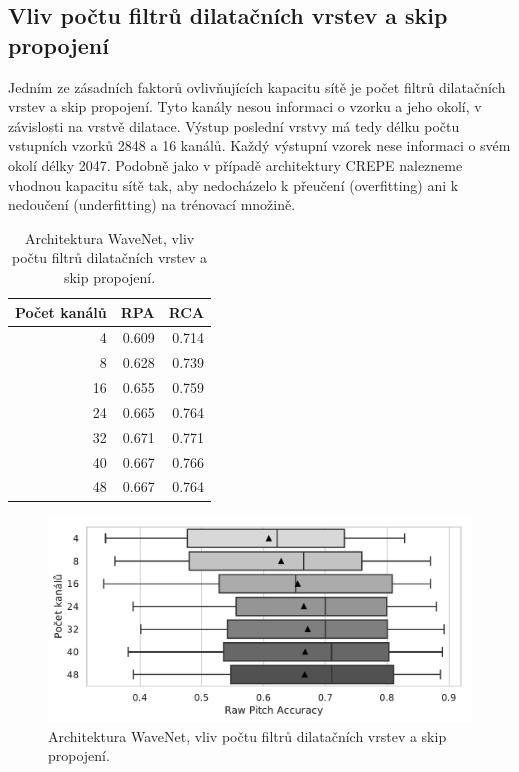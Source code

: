 \subsection{Vliv počtu filtrů dilatačních vrstev a skip propojení}

Jedním ze zásadních faktorů ovlivňujících kapacitu sítě je počet filtrů dilatačních vrstev a skip propojení. Tyto kanály nesou informaci o vzorku a jeho okolí, v závislosti na vrstvě dilatace. Výstup poslední vrstvy má tedy délku počtu vstupních vzorků 2848 a 16 kanálů. Každý výstupní vzorek nese informaci o svém okolí délky 2047. Podobně jako v případě architektury CREPE nalezneme vhodnou kapacitu sítě tak, aby nedocházelo k přeučení (overfitting) ani k nedoučení (underfitting) na trénovací množině.

\begin{table}[h!]
\centering
    \begin{tabular}{rrr}
    \toprule
    Počet kanálů &   RPA &   RCA \\
    \midrule
            4 & 0.609 & 0.714 \\
            8 & 0.628 & 0.739 \\
            16 & 0.655 & 0.759 \\
            24 & 0.665 & 0.764 \\
            32 & 0.671 & 0.771 \\
            40 & 0.667 & 0.766 \\
            48 & 0.667 & 0.764 \\
    \bottomrule
    \end{tabular}

\caption{Architektura WaveNet, vliv počtu filtrů dilatačních vrstev a skip propojení.}\label{tab:wavenet_dil_skip_channels}
\end{table}

\begin{figure}[h]\centering
    \includegraphics[scale=0.6]{../img/figures/wavenet_dil_skip_channels_grey}
\caption{Architektura WaveNet, vliv počtu filtrů dilatačních vrstev a skip propojení.}\label{obr:wavenet_dil_skip_channels}
\end{figure}

